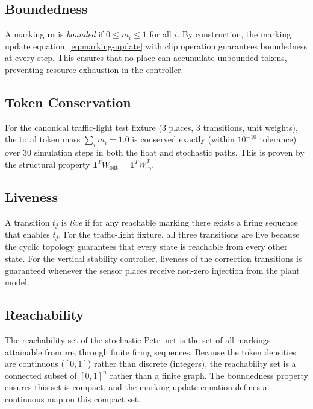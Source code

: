 \documentclass[12pt]{article}
\begin{document}
\subsection{Boundedness}

A marking $\mathbf{m}$ is \emph{bounded} if
$0 \le m_i \le 1$ for all $i$.  By construction, the marking update
equation~\eqref{eq:marking-update} with clip operation guarantees
boundedness at every step.  This ensures that no place can accumulate
unbounded tokens, preventing resource exhaustion in the controller.

\subsection{Token Conservation}

For the canonical traffic-light test fixture (3 places, 3 transitions,
unit weights), the total token mass $\sum_i m_i = 1.0$ is conserved
exactly (within $10^{-10}$ tolerance) over 30 simulation steps in both
the float and stochastic paths.  This is proven by the structural
property $\mathbf{1}^T W_{\mathrm{out}} = \mathbf{1}^T W_{\mathrm{in}}^T$.

\subsection{Liveness}

A transition $t_j$ is \emph{live} if for any reachable marking there
exists a firing sequence that enables $t_j$.  For the traffic-light
fixture, all three transitions are live because the cyclic topology
guarantees that every state is reachable from every other state.  For
the vertical stability controller, liveness of the correction
transitions is guaranteed whenever the sensor places receive non-zero
injection from the plant model.

\subsection{Reachability}

The reachability set of the stochastic Petri net is the set of all
markings attainable from $\mathbf{m}_0$ through finite firing sequences.
Because the token densities are continuous ($[0,1]$) rather than
discrete (integers), the reachability set is a connected subset of
$[0,1]^n$ rather than a finite graph.  The boundedness property ensures
this set is compact, and the marking update equation defines a
continuous map on this compact set.
\end{document}
